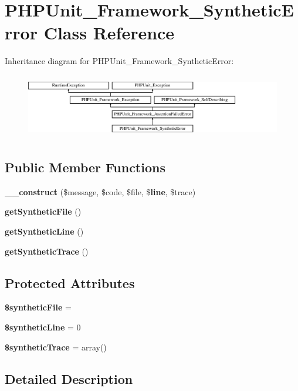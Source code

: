 \section{P\+H\+P\+Unit\+\_\+\+Framework\+\_\+\+Synthetic\+Error Class Reference}
\label{class_p_h_p_unit___framework___synthetic_error}
Inheritance diagram for P\+H\+P\+Unit\+\_\+\+Framework\+\_\+\+Synthetic\+Error\+:\begin{figure}[H]
\begin{center}
\leavevmode
\includegraphics[height=2.860792cm]{class_p_h_p_unit___framework___synthetic_error}
\end{center}
\end{figure}
\subsection*{Public Member Functions}
\begin{DoxyCompactItemize}
\item 
{\bf \+\_\+\+\_\+construct} (\$message, \$code, \$file, \${\bf line}, \$trace)
\item 
{\bf get\+Synthetic\+File} ()
\item 
{\bf get\+Synthetic\+Line} ()
\item 
{\bf get\+Synthetic\+Trace} ()
\end{DoxyCompactItemize}
\subsection*{Protected Attributes}
\begin{DoxyCompactItemize}
\item 
{\bf \$synthetic\+File} = \textquotesingle{}\textquotesingle{}
\item 
{\bf \$synthetic\+Line} = 0
\item 
{\bf \$synthetic\+Trace} = array()
\end{DoxyCompactItemize}


\subsection{Detailed Description}


